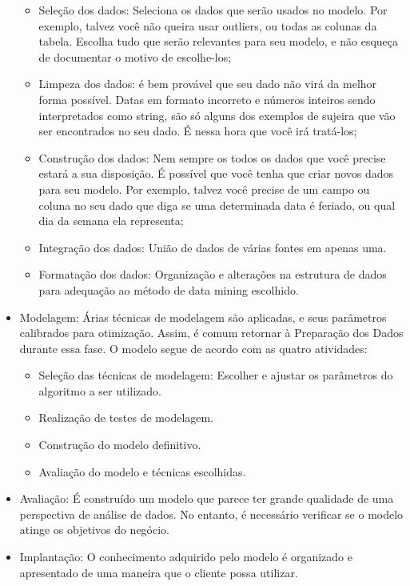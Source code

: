 \documentclass[]{article}
\providecommand{\tightlist}{%
  \setlength{\itemsep}{0pt}\setlength{\parskip}{0pt}}
\begin{document}
\begin{itemize}
  \begin{itemize}
  \tightlist
  \item
    Seleção dos dados: Seleciona os dados que serão usados no modelo.
    Por exemplo, talvez você não queira usar outliers, ou todas as
    colunas da tabela. Escolha tudo que serão relevantes para seu
    modelo, e não esqueça de documentar o motivo de escolhe-los;
  \item
    Limpeza dos dados: é bem provável que seu dado não virá da melhor
    forma possível. Datas em formato incorreto e números inteiros sendo
    interpretados como string, são só alguns dos exemplos de sujeira que
    vão ser encontrados no seu dado. É nessa hora que você irá
    tratá-los;
  \item
    Construção dos dados: Nem sempre os todos os dados que você precise
    estará a sua disposição. É possível que você tenha que criar novos
    dados para seu modelo. Por exemplo, talvez você precise de um campo
    ou coluna no seu dado que diga se uma determinada data é feriado, ou
    qual dia da semana ela representa;
  \item
    Integração dos dados: União de dados de várias fontes em apenas uma.
  \item
    Formatação dos dados: Organização e alterações na estrutura de dados
    para adequação ao método de data mining escolhido.
  \end{itemize}
\item
  Modelagem: Árias técnicas de modelagem são aplicadas, e seus
  parâmetros calibrados para otimização. Assim, é comum retornar à
  Preparação dos Dados durante essa fase. O modelo segue de acordo com
  as quatro atividades:

  \begin{itemize}
  \tightlist
  \item
    Seleção das técnicas de modelagem: Escolher e ajustar os parâmetros
    do algoritmo a ser utilizado.
  \item
    Realização de testes de modelagem.
  \item
    Construção do modelo definitivo.
  \item
    Avaliação do modelo e técnicas escolhidas.
  \end{itemize}
\item
  Avaliação: É construído um modelo que parece ter grande qualidade de
  uma perspectiva de análise de dados. No entanto, é necessário
  verificar se o modelo atinge os objetivos do negócio.
\item
  Implantação: O conhecimento adquirido pelo modelo é organizado e
  apresentado de uma maneira que o cliente possa utilizar.
\end{itemize}
\end{document}
